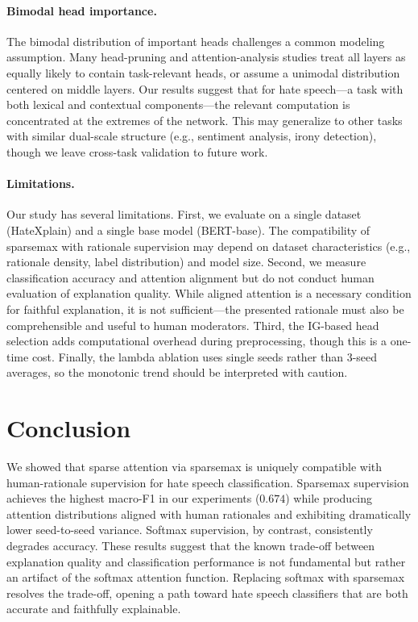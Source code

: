 \documentclass{article}
\begin{document}
\paragraph{Bimodal head importance.}
The bimodal distribution of important heads challenges a common modeling
assumption. Many head-pruning and attention-analysis studies treat all layers
as equally likely to contain task-relevant heads, or assume a unimodal
distribution centered on middle layers. Our results suggest that for hate
speech---a task with both lexical and contextual components---the relevant
computation is concentrated at the extremes of the network. This may
generalize to other tasks with similar dual-scale structure (e.g., sentiment
analysis, irony detection), though we leave cross-task validation to future
work.

\paragraph{Limitations.}
Our study has several limitations. First, we evaluate on a single dataset
(HateXplain) and a single base model (BERT-base). The compatibility of
sparsemax with rationale supervision may depend on dataset characteristics
(e.g., rationale density, label distribution) and model size. Second, we
measure classification accuracy and attention alignment but do not conduct
human evaluation of explanation quality. While aligned attention is a
necessary condition for faithful explanation, it is not sufficient---the
presented rationale must also be comprehensible and useful to human
moderators. Third, the IG-based head selection adds computational overhead
during preprocessing, though this is a one-time cost. Finally, the
lambda ablation uses single seeds rather than 3-seed averages, so the
monotonic trend should be interpreted with caution.

\section{Conclusion}
\label{sec:conclusion}

We showed that sparse attention via sparsemax is uniquely compatible with
human-rationale supervision for hate speech classification. Sparsemax
supervision achieves the highest macro-F1 in our experiments ($0.674$)
while producing attention distributions aligned with human rationales
and exhibiting dramatically lower seed-to-seed variance. Softmax
supervision, by contrast, consistently degrades accuracy. These results
suggest that the known trade-off between explanation quality and classification
performance is not fundamental but rather an artifact of the softmax
attention function. Replacing softmax with sparsemax resolves the trade-off,
opening a path toward hate speech classifiers that are both accurate and
faithfully explainable.
\end{document}
